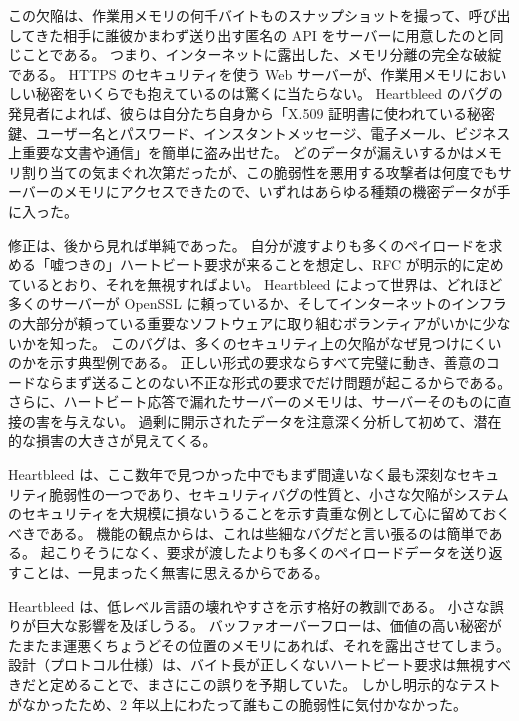\documentclass[uplatex]{jsarticle}
\def\label#1{}%
\begin{document}
この欠陥は、作業用メモリの何千バイトものスナップショットを撮って、呼び出してきた相手に誰彼かまわず送り出す匿名の API をサーバーに用意したのと同じことである。
つまり、インターネットに露出した、メモリ分離の完全な破綻である。
HTTPS のセキュリティを使う Web サーバーが、作業用メモリにおいしい秘密をいくらでも抱えているのは驚くに当たらない。
Heartbleed のバグの発見者によれば、彼らは自分たち自身から「X.509 証明書に使われている秘密鍵、ユーザー名とパスワード、インスタントメッセージ、電子メール、ビジネス上重要な文書や通信」を簡単に盗み出せた。
どのデータが漏えいするかはメモリ割り当ての気まぐれ次第だったが、この脆弱性を悪用する攻撃者は何度でもサーバーのメモリにアクセスできたので、いずれはあらゆる種類の機密データが手に入った。

修正は、後から見れば単純であった。
自分が渡すよりも多くのペイロードを求める「嘘つきの」ハートビート要求が来ることを想定し、RFC が明示的に定めているとおり、それを無視すればよい。
Heartbleed によって世界は、どれほど多くのサーバーが OpenSSL に頼っているか、そしてインターネットのインフラの大部分が頼っている重要なソフトウェアに取り組むボランティアがいかに少ないかを知った。
このバグは、多くのセキュリティ上の欠陥がなぜ見つけにくいのかを示す典型例である。
正しい形式の要求ならすべて完璧に動き、善意のコードならまず送ることのない不正な形式の要求でだけ問題が起こるからである。
さらに、ハートビート応答で漏れたサーバーのメモリは、サーバーそのものに直接の害を与えない。
過剰に開示されたデータを注意深く分析して初めて、潜在的な損害の大きさが見えてくる。

Heartbleed は、ここ数年で見つかった中でもまず間違いなく最も深刻なセキュリティ脆弱性の一つであり、セキュリティバグの性質と、小さな欠陥がシステムのセキュリティを大規模に損ないうることを示す貴重な例として心に留めておくべきである。
機能の観点からは、これは些細なバグだと言い張るのは簡単である。
起こりそうになく、要求が渡したよりも多くのペイロードデータを送り返すことは、一見まったく無害に思えるからである。

\begin{rem}[低レベル言語の壊れやすさ]\label{rem:ch9-heartbleed-lesson}
Heartbleed は、低レベル言語の壊れやすさを示す格好の教訓である。
小さな誤りが巨大な影響を及ぼしうる。
バッファオーバーフローは、価値の高い秘密がたまたま運悪くちょうどその位置のメモリにあれば、それを露出させてしまう。
設計（プロトコル仕様）は、バイト長が正しくないハートビート要求は無視すべきだと定めることで、まさにこの誤りを予期していた。
しかし明示的なテストがなかったため、2 年以上にわたって誰もこの脆弱性に気付かなかった。
\end{rem}
\end{document}
